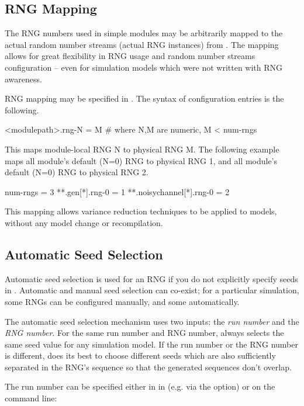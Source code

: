 \subsection{RNG Mapping}

The RNG numbers used in simple modules may be arbitrarily mapped to the
actual random number streams (actual RNG instances) from .
The mapping allows for great flexibility in RNG usage and random number
streams configuration -- even for simulation models which were not
written with RNG awareness.

RNG mapping may be specified in . The syntax of
configuration entries is the following.

\begin{inifile}
[General]
<modulepath>.rng-N = M  # where N,M are numeric, M < num-rngs
\end{inifile}

This maps module-local RNG N to physical RNG M. The following
example maps all  module's default (N=0) RNG to physical RNG 1,
and all  module's default (N=0) RNG to physical RNG 2.

\begin{inifile}
[General]
num-rngs = 3
**.gen[*].rng-0 = 1
**.noisychannel[*].rng-0 = 2
\end{inifile}

This mapping allows variance reduction techniques to be applied to
{\opp} models, without any model change or recompilation.


\subsection{Automatic Seed Selection}

Automatic seed selection is used for an RNG if you do not explicitly
specify seeds in . Automatic and manual seed selection can
co-exist; for a particular simulation, some RNGs can be configured
manually, and some automatically.

The automatic seed selection mechanism uses two inputs: the \textit{run number}
 and the \textit{RNG number}. For the same run number and RNG number,
{\opp} always selects the same seed value for any simulation model.
If the run number or the RNG number is different, {\opp} does its best
to choose different seeds which are also sufficiently separated in the RNG's sequence
so that the generated sequences don't overlap.

The run number can be specified either in in  (e.g. via the
 option) or on the command line:

